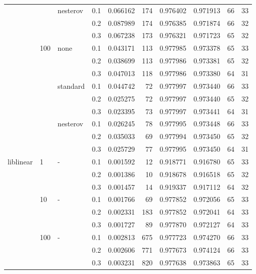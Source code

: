 \begin{table}[H]
\begin{tabular}{llllrrrrrr}
          &     & nesterov & 0.1 &  0.066162 &     174 &  0.976402 &  0.971913 &          66 &        33 \\
          &     &   & 0.2 &  0.087989 &     174 &  0.976385 &  0.971874 &          66 &        32 \\
          &     &   & 0.3 &  0.067238 &     173 &  0.976321 &  0.971723 &          65 &        32 \\
          & 100 & none & 0.1 &  0.043171 &     113 &  0.977985 &  0.973378 &          65 &        33 \\
          &     &   & 0.2 &  0.038699 &     113 &  0.977986 &  0.973381 &          65 &        32 \\
          &     &   & 0.3 &  0.047013 &     118 &  0.977986 &  0.973380 &          64 &        31 \\
          &     & standard & 0.1 &  0.044742 &      72 &  0.977997 &  0.973440 &          66 &        33 \\
          &     &   & 0.2 &  0.025275 &      72 &  0.977997 &  0.973440 &          65 &        32 \\
          &     &   & 0.3 &  0.023395 &      73 &  0.977997 &  0.973441 &          64 &        31 \\
          &     & nesterov & 0.1 &  0.026245 &      78 &  0.977995 &  0.973448 &          66 &        33 \\
          &     &   & 0.2 &  0.035033 &      69 &  0.977994 &  0.973450 &          65 &        32 \\
          &     &   & 0.3 &  0.025729 &      77 &  0.977995 &  0.973450 &          64 &        31 \\
liblinear & 1   & - & 0.1 &  0.001592 &      12 &  0.918771 &  0.916780 &          65 &        33 \\
          &     &   & 0.2 &  0.001386 &      10 &  0.918678 &  0.916518 &          65 &        32 \\
          &     &   & 0.3 &  0.001457 &      14 &  0.919337 &  0.917112 &          64 &        32 \\
          & 10  & - & 0.1 &  0.001766 &      69 &  0.977852 &  0.972056 &          65 &        33 \\
          &     &   & 0.2 &  0.002331 &     183 &  0.977852 &  0.972041 &          64 &        33 \\
          &     &   & 0.3 &  0.001727 &      89 &  0.977870 &  0.972127 &          64 &        33 \\
          & 100 & - & 0.1 &  0.002813 &     675 &  0.977723 &  0.974270 &          66 &        33 \\
          &     &   & 0.2 &  0.002606 &     771 &  0.977673 &  0.974124 &          66 &        33 \\
          &     &   & 0.3 &  0.003231 &     820 &  0.977638 &  0.973863 &          65 &        33 \\
\bottomrule
\end{tabular}
\end{table}
